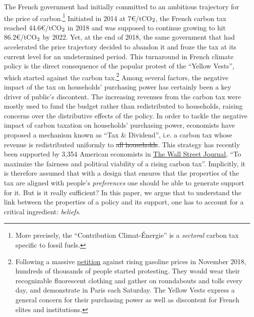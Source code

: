 \documentclass[12pt]{article} %
\providecommand{\DIFaddtex}[1]{{\protect\color{blue}\uwave{#1}}} %
\providecommand{\DIFdeltex}[1]{{\protect\color{red}\sout{#1}}}                      %
\providecommand{\DIFaddbegin}{} %
\providecommand{\DIFaddend}{} %
\providecommand{\DIFdelbegin}{} %
\providecommand{\DIFdelend}{} %
\providecommand{\DIFadd}[1]{\texorpdfstring{\DIFaddtex{#1}}{#1}} %
\providecommand{\DIFdel}[1]{\texorpdfstring{\DIFdeltex{#1}}{}} %
\newcommand{\DIFscaledelfig}{0.5}
\newlength{\DIFdelgraphicswidth} %
\newlength{\DIFdelgraphicsheight} %
\newcommand{\DIFaddincludegraphics}[2][]{{\color{blue}\fbox{\DIFOincludegraphics[#1]{#2}}}} %
\newcommand{\DIFdelincludegraphics}[2][]{%
\sbox{\DIFdelgraphicsbox}{\DIFOincludegraphics[#1]{#2}}%
\settoboxwidth{\DIFdelgraphicswidth}{\DIFdelgraphicsbox} %
\settoboxtotalheight{\DIFdelgraphicsheight}{\DIFdelgraphicsbox} %
\scalebox{\DIFscaledelfig}{%
\parbox[b]{\DIFdelgraphicswidth}{\usebox{\DIFdelgraphicsbox}\\[-\baselineskip] \rule{\DIFdelgraphicswidth}{0em}}\llap{\resizebox{\DIFdelgraphicswidth}{\DIFdelgraphicsheight}{%
\setlength{\unitlength}{\DIFdelgraphicswidth}%
\begin{picture}(1,1)%
\thicklines\linethickness{2pt} %
{\color[rgb]{1,0,0}\put(0,0){\framebox(1,1){}}}%
{\color[rgb]{1,0,0}\put(0,0){\line( 1,1){1}}}%
{\color[rgb]{1,0,0}\put(0,1){\line(1,-1){1}}}%
\end{picture}%
}\hspace*{3pt}}} %
} %
\DeclareRobustCommand{\DIFaddbegin}{\DIFOaddbegin \let\includegraphics\DIFaddincludegraphics} %
\DeclareRobustCommand{\DIFaddend}{\DIFOaddend \let\includegraphics\DIFOincludegraphics} %
\DeclareRobustCommand{\DIFdelbegin}{\DIFOdelbegin \let\includegraphics\DIFdelincludegraphics} %
\DeclareRobustCommand{\DIFdelend}{\DIFOaddend \let\includegraphics\DIFOincludegraphics} %
\begin{document}
The French government had initially committed to an ambitious trajectory for the price of carbon.\footnote{More precisely, the ``Contribution Climat-Énergie'' is a \textit{sectoral} carbon tax specific to fossil fuels.} Initiated in 2014 at 7\euro/tCO$_\textnormal{2}$, the French carbon tax reached 44.6\euro/tCO$_\textnormal{2}$ in 2018 and was supposed to continue growing to hit 86.2\euro/tCO$_\textnormal{2}$ by 2022. Yet, at the end of 2018, the same government that had accelerated the price trajectory decided to abandon it and froze the tax at its current level for an undetermined period. This turnaround in French climate policy is the direct consequence of the popular protest of the ``Yellow Vests'', which started against the carbon tax.\footnote{Following a massive \href{https://www.change.org/p/pour-une-baisse-des-prix-\%C3\%A0-la-pompe-essence-diesel}{petition} against rising gasoline prices in November 2018, hundreds of thousands of people started protesting. They would wear their recognizable fluorescent clothing and gather on roundabouts and tolls every day, and demonstrate in Paris each Saturday. The Yellow Vests express a general concern for their purchasing power as well as discontent for French elites and institutions.} Among several factors, the negative impact of the tax on households' purchasing power has certainly been a key driver of public's discontent. The increasing revenues from the carbon tax were mostly used to fund the budget rather than redistributed to households, raising concerns over the distributive effects of the policy. In order to tackle the negative impact of carbon taxation on households' purchasing power, economists have proposed a mechanism known as ``Tax \& Dividend'', i.e. a carbon tax whose revenue is redistributed uniformly to \DIFdelbegin \DIFdel{all households}\DIFdelend \DIFaddbegin \DIFadd{each adult}\DIFaddend . This strategy has recently been supported by 3,354 American economists in \href{https://www.clcouncil.org/media/EconomistsStatement.pdf}{The Wall Street Journal}, ``To maximize the fairness and political viability of a rising carbon tax''. Implicitly, it is therefore assumed that with a design that ensures that the properties of the tax are aligned with people's \textit{preferences} one should be able to generate support for it. But is it really sufficient? In this paper, we argue that to understand the link between the properties of a policy and its support, one has to account for a critical ingredient: \textit{beliefs}.
\end{document}
